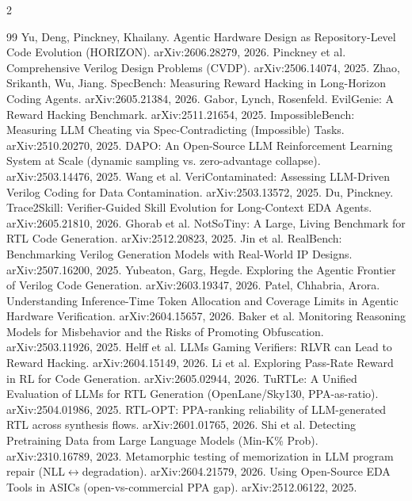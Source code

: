 \documentclass[10pt]{article}
\begin{document}
\begin{multicols}{2}\raggedright
\begin{thebibliography}{99}\scriptsize\setlength{\itemsep}{0pt}
 Yu, Deng, Pinckney, Khailany. Agentic Hardware Design as Repository-Level Code Evolution (HORIZON). arXiv:2606.28279, 2026.
 Pinckney et al. Comprehensive Verilog Design Problems (CVDP). arXiv:2506.14074, 2025.
 Zhao, Srikanth, Wu, Jiang. SpecBench: Measuring Reward Hacking in Long-Horizon Coding Agents. arXiv:2605.21384, 2026.
 Gabor, Lynch, Rosenfeld. EvilGenie: A Reward Hacking Benchmark. arXiv:2511.21654, 2025.
 ImpossibleBench: Measuring LLM Cheating via Spec-Contradicting (Impossible) Tasks. arXiv:2510.20270, 2025.
 DAPO: An Open-Source LLM Reinforcement Learning System at Scale (dynamic sampling vs. zero-advantage collapse). arXiv:2503.14476, 2025.
 Wang et al. VeriContaminated: Assessing LLM-Driven Verilog Coding for Data Contamination. arXiv:2503.13572, 2025.
 Du, Pinckney. Trace2Skill: Verifier-Guided Skill Evolution for Long-Context EDA Agents. arXiv:2605.21810, 2026.
 Ghorab et al. NotSoTiny: A Large, Living Benchmark for RTL Code Generation. arXiv:2512.20823, 2025.
 Jin et al. RealBench: Benchmarking Verilog Generation Models with Real-World IP Designs. arXiv:2507.16200, 2025.
 Yubeaton, Garg, Hegde. Exploring the Agentic Frontier of Verilog Code Generation. arXiv:2603.19347, 2026.
 Patel, Chhabria, Arora. Understanding Inference-Time Token Allocation and Coverage Limits in Agentic Hardware Verification. arXiv:2604.15657, 2026.
 Baker et al. Monitoring Reasoning Models for Misbehavior and the Risks of Promoting Obfuscation. arXiv:2503.11926, 2025.
 Helff et al. LLMs Gaming Verifiers: RLVR can Lead to Reward Hacking. arXiv:2604.15149, 2026.
 Li et al. Exploring Pass-Rate Reward in RL for Code Generation. arXiv:2605.02944, 2026.
 TuRTLe: A Unified Evaluation of LLMs for RTL Generation (OpenLane/Sky130, PPA-as-ratio). arXiv:2504.01986, 2025.
 RTL-OPT: PPA-ranking reliability of LLM-generated RTL across synthesis flows. arXiv:2601.01765, 2026.
 Shi et al. Detecting Pretraining Data from Large Language Models (Min-K\% Prob). arXiv:2310.16789, 2023.
 Metamorphic testing of memorization in LLM program repair (NLL$\leftrightarrow$degradation). arXiv:2604.21579, 2026.
 Using Open-Source EDA Tools in ASICs (open-vs-commercial PPA gap). arXiv:2512.06122, 2025.
\end{thebibliography}
\end{multicols}
\end{document}
